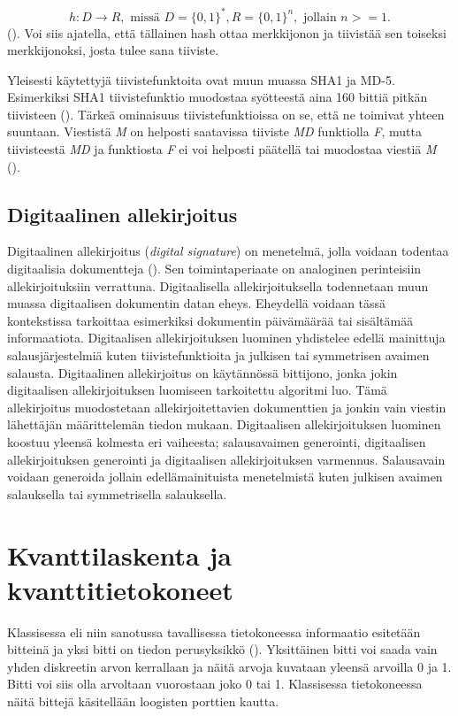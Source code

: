  \[h: D \to R, \text{ missä } D = \big\{0,1\big\}^{*}, R = \big\{0,1\big\}^{n}, \text{ jollain } n >= 1.\] (\cite{sobti2012cryptographic}). Voi siis ajatella, että tällainen hash ottaa merkkijonon ja tiivistää sen toiseksi merkkijonoksi, josta tulee sana tiiviste.
 
 Yleisesti käytettyjä tiivistefunktoita ovat muun muassa SHA1 ja MD-5. Esimerkiksi SHA1 tiivistefunktio muodostaa syötteestä aina 160 bittiä pitkän tiivisteen (\cite{bellare2005introduction}). Tärkeä ominaisuus tiivistefunktioissa on se, että ne toimivat yhteen suuntaan. Viestistä \emph{M} on helposti saatavissa tiiviste \emph{MD} funktiolla \emph{F}, mutta tiivisteestä \emph{MD} ja funktiosta \emph{F} ei voi helposti päätellä tai muodostaa viestiä \emph{M} (\cite{bakhtiari1995cryptographic}).
 
 \subsection{Digitaalinen allekirjoitus}
 Digitaalinen allekirjoitus (\emph{digital signature}) on menetelmä, jolla voidaan todentaa digitaalisia dokumentteja (\cite{1649003}). Sen toimintaperiaate on analoginen perinteisiin allekirjoituksiin verrattuna. Digitaalisella allekirjoituksella todennetaan muun muassa digitaalisen dokumentin datan eheys. Eheydellä voidaan tässä kontekstissa tarkoittaa esimerkiksi dokumentin päivämäärää tai sisältämää informaatiota. Digitaalisen allekirjoituksen luominen yhdistelee edellä mainittuja salausjärjestelmiä kuten tiivistefunktioita ja julkisen tai symmetrisen avaimen salausta. Digitaalinen allekirjoitus on käytännössä bittijono, jonka jokin digitaalisen allekirjoituksen luomiseen tarkoitettu algoritmi luo. Tämä allekirjoitus muodostetaan allekirjoitettavien dokumenttien ja jonkin vain viestin lähettäjän määrittelemän tiedon mukaan. Digitaalisen allekirjoituksen luominen koostuu yleensä kolmesta eri vaiheesta; salausavaimen generointi, digitaalisen allekirjoituksen generointi ja digitaalisen allekirjoituksen varmennus. Salausavain voidaan generoida jollain edellämainituista menetelmistä kuten julkisen avaimen salauksella tai symmetrisella salauksella.

\section{Kvanttilaskenta ja kvanttitietokoneet}
Klassisessa eli niin sanotussa tavallisessa tietokoneessa informaatio esitetään bitteinä ja yksi bitti on tiedon perusyksikkö (\cite{doi:10.1080/23742917.2016.1226650}). Yksittäinen bitti voi saada vain yhden diskreetin arvon kerrallaan ja näitä arvoja kuvataan yleensä arvoilla 0 ja 1. Bitti voi siis olla arvoltaan vuorostaan joko 0 tai 1. Klassisessa tietokoneessa näitä bittejä käsitellään loogisten porttien kautta.


